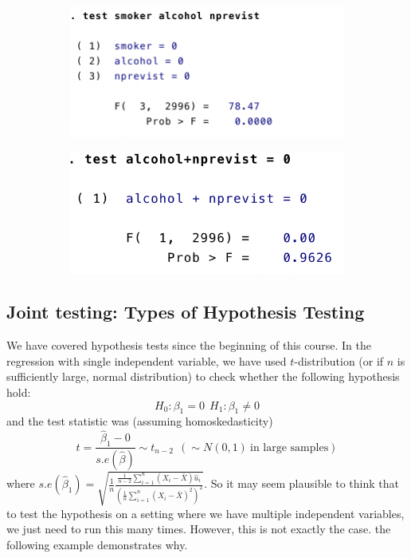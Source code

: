 \documentclass[12pt]{article}
\theoremstyle{definition}
\theoremstyle{property}
\theoremstyle{assumption}
\theoremstyle{example}
\theoremstyle{comment}
\begin{document}
\begin{figure}[H]
\begin{center}
        \begin{subfigure}[b]{0.45\textwidth}
	\centering
                \includegraphics[width=\linewidth]{test}
        \end{subfigure}
        \begin{subfigure}[b]{0.45\textwidth}
	\centering
                \includegraphics[width=\linewidth]{test1}
        \end{subfigure}
\end{center}
\end{figure}




\subsection{Joint testing: Types of Hypothesis Testing}
We have covered hypothesis tests since the beginning of this course. In the regression with single independent variable, we have used $t$-distribution (or if $n$ is sufficiently large, normal distribution) to check whether the following hypothesis hold:
\[
H_0 : \beta_1 = 0 \ \ H_1 : \beta_1 \neq 0
\]
and the test statistic was (assuming homoskedasticity)
\[
t=\frac{\hat{\beta}_1-0}{s.e(\hat{\beta})}\sim t_{n-2} \ \ (\sim N(0,1) \ \text{in large samples})
\]
where $s.e(\hat{\beta}_1)=\sqrt{\frac{1}{n}\frac{\frac{1}{n-2}\sum_{i=1}^n(X_i-\bar{X})\hat{u}_i}{(\frac{1}{n}\sum_{i=1}^n (X_i-\bar{X})^2)^2}}$. So it may seem plausible to think that to test the hypothesis on a setting where we have multiple independent variables, we just need to run this many times. However, this is not exactly the case. the following example demonstrates why. \\ \par
\end{document}
